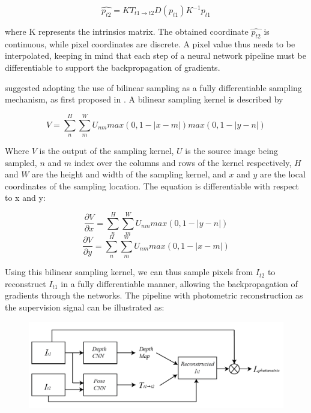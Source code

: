 \documentclass[openany]{book}
\begin{document}
\begin{equation}
\hat{p_{t2}} = KT_{t1\rightarrow t2} D(p_{t1}) K^{-1} p_{t1}
\end{equation}

where K represents the intrinsics matrix. The obtained coordinate $\hat{p_{t2}}$ is continuous, while pixel coordinates are discrete. A pixel value thus needs to be interpolated, keeping in mind that each step of a neural network pipeline must be differentiable to support the backpropagation of gradients. 

\cite{zhou2017unsupervised} suggested adopting the use of bilinear sampling as a fully differentiable sampling mechanism, as first proposed in \cite{jaderberg2015spatialtransformer}. A bilinear sampling kernel is described by 

\begin{equation}
    V = \sum_n^H \sum_m^W U_{nm} max (0, 1-|x - m|) max(0, 1-|y - n|)
\end{equation}

Where $V$ is the output of the sampling kernel, $U$ is the source image being sampled, $n$ and $m$ index over the columns and rows of the kernel respectively, $H$ and $W$ are the height and width of the sampling kernel, and $x$ and $y$ are the local coordinates of the sampling location. The equation is differentiable with respect to x and y:


\begin{equation}
    \frac{\partial{V}}{\partial{x}} = \sum_n^H \sum_m^W U_{nm} max(0, 1-|y - n|)
\end{equation}
\begin{equation}
    \frac{\partial{V}}{\partial{y}} = \sum_n^H \sum_m^W U_{nm} max(0, 1-|x - m|)
\end{equation}

Using this bilinear sampling kernel, we can thus sample pixels from $I_{t2}$ to reconstruct $I_{t1}$ in a fully differentiable manner, allowing the backpropagation of gradients through the networks. The pipeline with photometric reconstruction as the supervision signal can be illustrated as: 


\begin{figure}
    \centering 
    \includegraphics[width=5in]{images/mlpipeline.png}
\end{figure}
\end{document}
